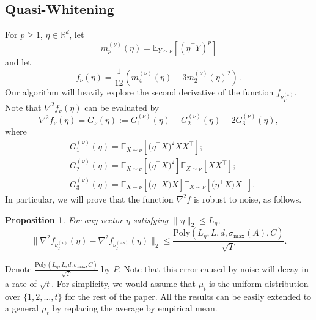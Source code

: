 \documentclass[twoside]{article}
\newcommand{\E}{\mathbb{E}}
\newcommand{\real}{\mathbb{R}}
\newtheorem{prop}[lemma]{Proposition}
\theoremstyle{definition}
\begin{document}
\subsection{Quasi-Whitening}
For $p\ge 1$, $\eta\in \real^d$, 
let 
\begin{equation}
\label{eq:momnent}
m_p^{(\nu)}(\eta) = \E_{Y\sim \nu}[ (\eta^\top Y)^p ]
\end{equation}
and let
\begin{equation}
\label{eq:funcf}
f_{\nu}(\eta) = \frac1{12} \left( m_4^{(\nu)}(\eta) - 3 m_2^{(\nu)}(\eta)^2 \right)\,.
\end{equation}
Our algorithm will heavily explore the second derivative of the function $f_{\nu_T^{(x)}}$. 
Note that $\nabla^2f_{\nu}(\eta)$  can be evaluated by
\begin{equation}
\label{eq:G}
\nabla^2 f_{\nu}(\eta) = G_{\nu}(\eta):= G_1^{(\nu)}(\eta) - G_2^{(\nu)}(\eta) -2G_3^{(\nu)}(\eta),
\end{equation}
where 
\vspace{-3mm}
\begin{align*}
& G_1^{(\nu)}(\eta) =  \E_{X\sim \nu} [\big(\eta^{\top}X\big)^2XX^{\top}]; \\
& G_2^{(\nu)}(\eta) = \E_{X\sim \nu} [\big(\eta^{\top}X\big)^2] \E_{X\sim \nu} [XX^{\top}]; \\
& G_3^{(\nu)}(\eta) = \E_{X\sim \nu} [\big(\eta^{\top}X\big)X] \E_{X\sim \nu} [\big(\eta^{\top}X\big)X^{\top}].
\end{align*} 
In particular, we will prove that the function $\nabla^2f$ is robust to noise, as follows. 
\begin{prop}
\label{prop:denoise}
For any vector $\eta$ satisfying $\|\eta\|_2\le L_{\eta}$,
\[
\| \nabla^2f_{\nu_T^{(x)}}(\eta) - \nabla^2f_{\nu_T^{(As)}}(\eta) \|_2 \le \frac{\text{Poly}(L_{\eta}, L, d, \sigma_{\max}(A), C)}{\sqrt{T}}. 
\] 
\end{prop}  
Denote $\frac{\text{Poly}(L_{\eta}, L, d, \sigma_{\max}, C)}{\sqrt{T}}$ by $P$. Note that this error caused by noise will decay in a rate of $\sqrt{t}$.
For simplicity, we would assume that $\mu_t$ is the uniform distribution over $\{1,2,\ldots, t\}$ for the rest of the paper.
All the results can be easily extended to a general $\mu_t$ by replacing the average by empirical mean. 
\end{document}
